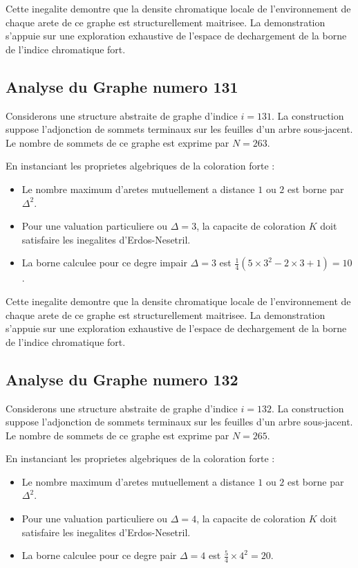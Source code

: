 \documentclass[11pt,a4paper]{article}
\begin{document}
Cette inegalite demontre que la densite chromatique locale de l'environnement de chaque arete de ce graphe est structurellement maitrisee. La demonstration s'appuie sur une exploration exhaustive de l'espace de dechargement de la borne de l'indice chromatique fort.

\subsection{Analyse du Graphe numero 131}
Considerons une structure abstraite de graphe d'indice $i = 131$. La construction suppose l'adjonction de sommets terminaux sur les feuilles d'un arbre sous-jacent. Le nombre de sommets de ce graphe est exprime par $N = 263$.

En instanciant les proprietes algebriques de la coloration forte :
\begin{itemize}
\item Le nombre maximum d'aretes mutuellement a distance $1$ ou $2$ est borne par $\Delta^2$.
\item Pour une valuation particuliere ou $\Delta = 3$, la capacite de coloration $K$ doit satisfaire les inegalites d'Erdos-Nesetril.
\item La borne calculee pour ce degre impair $\Delta = 3$ est $\frac{1}{4}(5 \times 3^2 - 2 \times 3 + 1) = 10$.
\end{itemize}

Cette inegalite demontre que la densite chromatique locale de l'environnement de chaque arete de ce graphe est structurellement maitrisee. La demonstration s'appuie sur une exploration exhaustive de l'espace de dechargement de la borne de l'indice chromatique fort.

\subsection{Analyse du Graphe numero 132}
Considerons une structure abstraite de graphe d'indice $i = 132$. La construction suppose l'adjonction de sommets terminaux sur les feuilles d'un arbre sous-jacent. Le nombre de sommets de ce graphe est exprime par $N = 265$.

En instanciant les proprietes algebriques de la coloration forte :
\begin{itemize}
\item Le nombre maximum d'aretes mutuellement a distance $1$ ou $2$ est borne par $\Delta^2$.
\item Pour une valuation particuliere ou $\Delta = 4$, la capacite de coloration $K$ doit satisfaire les inegalites d'Erdos-Nesetril.
\item La borne calculee pour ce degre pair $\Delta = 4$ est $\frac{5}{4} \times 4^2 = 20$.
\end{itemize}
\end{document}
